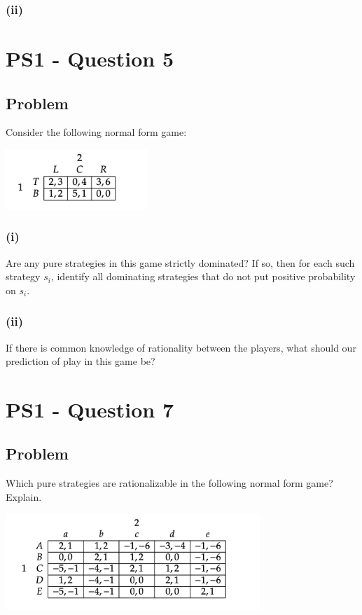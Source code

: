 \documentclass[10pt, a4paper]{article}
\begin{document}
    \subsubsection*{(ii)}
      
\section*{PS1 - Question 5}
  \subsection*{Problem}
    Consider the following normal form game:
    \begin{center}
      \includegraphics[width = 0.4\textwidth]{PS1-5.png}
    \end{center}
    \subsubsection*{(i)}
      Are any pure strategies in this game strictly dominated? If so, then for each such strategy $s_i$, identify all dominating strategies that do not put positive probability on $s_i$.
    \subsubsection*{(ii)}
      If there is common knowledge of rationality between the players, what should our prediction of play in this game be?
\section*{PS1 - Question 7}
  \subsection*{Problem}
    Which pure strategies are rationalizable in the following normal form game? Explain.
    \begin{center}
      \includegraphics[width = 0.72\textwidth]{PS1-7.png}
    \end{center}
\end{document}
